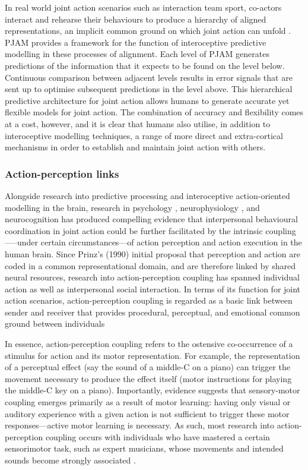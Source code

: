 \begin{CJK}{UTF8}{gbsn}
In real world joint action scenarios such as interaction team sport, co-actors interact and rehearse their behaviours to produce a hierarchy of aligned representations, an implicit common ground on which joint action can unfold \citep{Noy2017}.  PJAM provides a framework for the function of interoceptive predictive modelling in these processes of alignment.  Each level of PJAM generates predictions of the information that it expects to be found on the level below.  Continuous comparison between adjacent levels results in error signals that are sent up to optimise subsequent predictions in the level above.  This hierarchical predictive architecture for joint action allows humans to generate accurate yet flexible models for joint action. The combination of accuracy and flexibility comes at a cost, however, and it is clear that humans also utilise, in addition to interoceptive modelling techniques, a range of more direct and extra-cortical mechanisms in order to establish and maintain joint action with others.


\subsubsection{Action-perception links}

Alongside research into predictive processing and interoceptive action-oriented modelling in the brain, research in psychology \citep{Prinz1990,Prinz1997,Prinz2013}, neurophysiology \citep{Rizzolatti2004,Rizzolatti2010}, and neurocognition \citep{Wolpert1998,Wolpert2000} has produced compelling evidence that interpersonal behavioural coordination in joint action could be further facilitated by the intrinsic coupling—--under certain circumstances---of action perception and action execution in the human brain.  Since Prinz’s (1990) initial proposal that perception and action are coded in a common representational domain, and are therefore linked by shared neural resources, research into action-perception coupling has spanned individual action as well as interpersonal social interaction.
In terms of its function for joint action scenarios, action-perception coupling is regarded as a basic link between sender and receiver \citep{Rizzolatti1998} that provides procedural, perceptual, and emotional common ground between individuals \citep{Sebanz2006}

In essence, action-perception coupling refers to the ostensive co-occurrence of a stimulus for action and its motor representation.  For example, the representation of a perceptual effect (say the sound of a middle-C on a piano) can trigger the movement necessary to produce the effect itself (motor instructions for playing the middle-C key on a piano).   Importantly, evidence suggests that sensory-motor coupling emerges primarily as a result of motor learning: having only visual \citep{Candidi2014} or auditory \citep{Lahav2007} experience with a given action is not sufficient to trigger these motor responses—active motor learning is necessary.  As such, most research into action-perception coupling occurs with individuals who have mastered a certain sensorimotor task, such as expert musicians, whose movements and intended sounds become strongly associated \citep{Novembre2014}.


\end{CJK}
